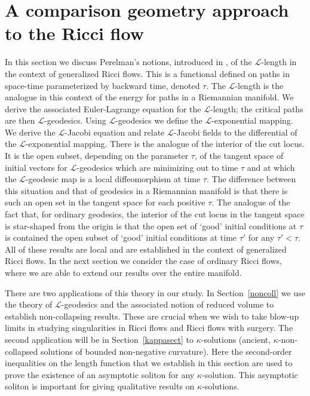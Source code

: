 \chapter{A comparison geometry approach to the Ricci
flow}\label{chap:comparison-geometry}
\label{lengthfn}

In this section we discuss Perelman's notions, introduced in
\cite{Perelman1}, of the ${\mathcal L}$-length in the context of generalized Ricci flows. This is a
functional defined on paths in space-time parameterized by backward
time, denoted $\tau$. The ${\mathcal L}$-length is the analogue in
this context of the energy for paths in a Riemannian manifold. We
derive the associated Euler-Lagrange equation for the ${\mathcal
L}$-length; the critical paths are then ${\mathcal
L}$-geodesics. Using ${\mathcal
L}$-geodesics we define the ${\mathcal L}$-exponential
mapping. We derive the
${\mathcal L}$-Jacobi equation
and relate ${\mathcal L}$-Jacobi fields to the differential of the ${\mathcal L}$-exponential
mapping. There is the analogue of the interior of the cut locus. It
is the open subset, depending on the parameter $\tau$, of the
tangent space of initial vectors for ${\mathcal L}$-geodesics which
are minimizing out to time $\tau$ and at which the ${\mathcal
L}$-geodesic map is a local diffeomorphism at time $\tau$. The
difference between this situation and that of geodesics in a
Riemannian manifold is that there is such an open set in the tangent
space for each positive $\tau$. The analogue of the fact that, for
ordinary geodesics, the interior of the cut locus in the tangent
space is star-shaped from the origin is that the open set of `good'
initial conditions at $\tau$ is contained the open subset of `good'
initial conditions at time $\tau'$ for any $\tau'<\tau$. All of
these results are local and are established in the context of
generalized Ricci flows. In the next section we consider the case of
ordinary Ricci flows, where we are able to extend our results over
the entire manifold.

There are two applications of this theory in our study. In
Section~\ref{noncoll} we use the theory of ${\mathcal L}$-geodesics and the
associated notion of reduced volume to establish non-collapsing results. These
are crucial when we wish to take blow-up limits in studying singularities in
Ricci flows and Ricci flows with surgery. The second application will be in
Section~\ref{kappasect} to $\kappa$-solutions (ancient, $\kappa$-non-collapsed
solutions of bounded non-negative curvature). Here the second-order
inequalities on the length function that we establish in this section are used
to prove the existence of an asymptotic soliton for any $\kappa$-solution. This
asymptotic soliton is important for giving qualitative results on
$\kappa$-solutions.


